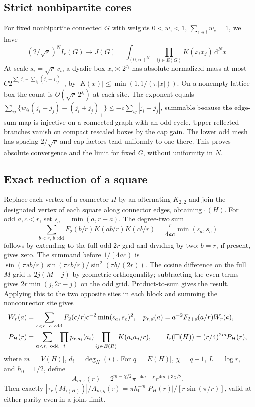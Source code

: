 \documentclass[11pt]{article}
\theoremstyle{definition}
\newcommand{\dd}{\mathrm d}
\begin{document}
\subsection{Strict nonbipartite cores}\label{sec:rigidbridge}
For fixed nonbipartite connected \(G\) with weights \(0<w_e<1\), \(\sum_{e\ni i}w_e=1\), we have
\begin{equation}\label{eq:strictbridge}
 (2/\sqrt r)^N I_r(G)\longrightarrow J(G)
 =\int_{(0,\infty)^N}\prod_{ij\in E(G)}K(x_i x_j)\,\dd^Nx .
\end{equation}
At scale \(s_i=\sqrt r\,x_i\), a dyadic box \(x_i\asymp2^{j_i}\) has absolute normalized mass at most \(C2^{\sum_i j_i-\sum_{ij}(j_i+j_j)_+}\), by \(|K(x)|\le\min(1,1/(\pi |x|))\). On a nonempty lattice box the count is \(O(\sqrt r\,2^{j_i})\) at each site. The exponent equals \(\sum_{ij}\{w_{ij}(j_i+j_j)-(j_i+j_j)_+\}\le-c\sum_{ij}|j_i+j_j|\), summable because the edge-sum map is injective on a connected graph with an odd cycle. Upper reflected branches vanish on compact rescaled boxes by the cap gain. The lower odd mesh has spacing \(2/\sqrt r\) and cap factors tend uniformly to one there. This proves absolute convergence and the limit for fixed \(G\), without uniformity in \(N\).

\subsection{Exact reduction of a square}\label{sec:square}
Replace each vertex of a connector \(H\) by an alternating \(K_{2,2}\) and join the designated vertex of each square along connector edges, obtaining \(\square(H)\). For odd \(a,c<r\), set \(s_a=\min(a,r-a)\). The degree-two sum
\begin{equation}\label{eq:two}
 \sum_{b<r,\ b\text{ odd}}F_2(b/r)K(ab/r)K(cb/r)
 =\frac{r}{4ac}\min(s_a,s_c)
\end{equation}
follows by extending to the full odd \(2r\)-grid and dividing by two; \(b=r\), if present, gives zero. The summand before \(1/(4ac)\) is \(\sin(\pi ab/r)\sin(\pi cb/r)/\sin^2(\pi b/(2r))\). The cosine difference on the full \(M\)-grid is \(2j(M-j)\) by geometric orthogonality; subtracting the even terms gives \(2r\min(j,2r-j)\) on the odd grid. Product-to-sum gives the result. Applying this to the two opposite sites in each block and summing the nonconnector site gives
\begin{align}
 W_r(a)&=\sum_{c<r,\ c\ {\rm odd}}F_2(c/r)c^{-2}\min(s_a,s_c)^2,\quad
 p_{r,d}(a)=a^{-2}F_{2+d}(a/r)W_r(a),\notag\\
 P_H(r)&=\sum_{\boldsymbol a<r,\ {\rm odd}}\prod_i p_{r,d_i}(a_i)
        \prod_{ij\in E(H)}K(a_i a_j/r),\qquad
 I_r(\square(H))=(r/4)^{2m}P_H(r),\label{eq:square}
\end{align}
where \(m=|V(H)|\), \(d_i=\deg_H(i)\). For \(q=|E(H)|\), \(\chi=q+1\), \(L=\log r\), and \(h_0=1/2\), define
\[
 A_{m,q}(r)=2^{m-\chi/2}\pi^{-4m-\chi}r^{4m+3\chi/2}.
\]
Then exactly \(|\tau_r(M_{\square(H)})|/A_{m,q}(r)=\pi h_0^{-m}|P_H(r)|/[r\sin(\pi/r)]\), valid at either parity even in a joint limit.
\end{document}
